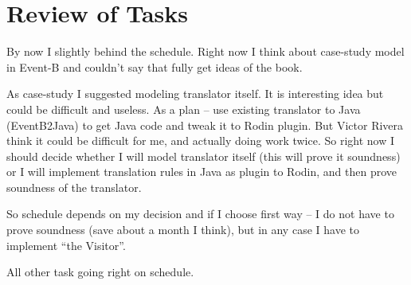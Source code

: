 \section{Review of Tasks}


By now I slightly behind the schedule. Right now I think about case-study model
in Event-B and couldn't say that fully get ideas of the book.

As case-study I suggested modeling translator itself. It is interesting idea but
could be difficult and useless. As a plan 
 -- use existing translator to Java (EventB2Java) to get Java code and
tweak it to Rodin plugin. But Victor Rivera think it could be difficult for me,
and actually doing work twice. So right now I should decide whether I will model
translator itself (this will prove it soundness) or I will implement translation
rules in Java as plugin to Rodin, and then prove soundness of the translator.

So schedule depends on my decision and if I choose first way -- I do not have to
prove soundness (save about a month I think), but in any case I have to
implement ``the Visitor''.

All other task going right on schedule.